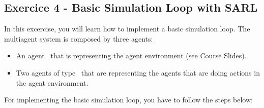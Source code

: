 \documentclass[english,nodocumentinfo,nopubpage]{utbmciadreport}
\begin{document}
\subsection{Exercice 4 - Basic Simulation Loop with SARL}

In this excercise, you will learn how to implement a basic simulation loop.
The multiagent system is composed by three agents:
\begin{itemize}
\item An agent \ that is representing the agent environment (see Course Slides).
\item Two agents of type \ that are representing the agents that are doing actions in the agent environment.
\end{itemize}

For implementing the basic simulation loop, you have to follow the steps below:
\end{document}
